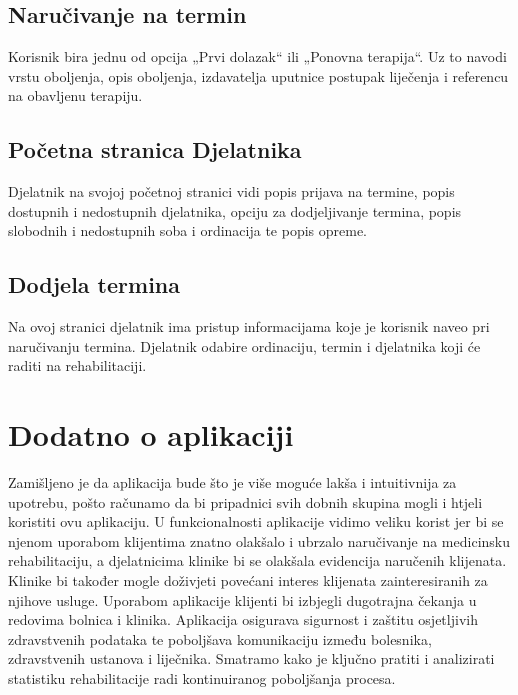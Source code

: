         \subsection{Naručivanje na termin}

        Korisnik bira jednu od opcija „Prvi dolazak“ ili „Ponovna terapija“. Uz to navodi vrstu oboljenja, opis oboljenja, izdavatelja uputnice postupak liječenja i referencu na obavljenu terapiju.

        \subsection{Početna stranica Djelatnika}

        Djelatnik na svojoj početnoj stranici vidi popis prijava na termine, popis dostupnih i nedostupnih djelatnika, opciju za dodjeljivanje termina, popis slobodnih i nedostupnih soba i ordinacija te popis opreme.

        \subsection{Dodjela termina}

        Na ovoj stranici djelatnik ima pristup informacijama koje je korisnik naveo pri naručivanju termina. Djelatnik odabire ordinaciju, termin i djelatnika koji će raditi na rehabilitaciji.

        \section{Dodatno o aplikaciji}

        Zamišljeno je da aplikacija bude što je više moguće lakša i intuitivnija za upotrebu, pošto računamo da bi pripadnici svih dobnih skupina mogli i htjeli koristiti ovu aplikaciju. U funkcionalnosti aplikacije vidimo veliku korist jer bi se njenom uporabom klijentima  znatno olakšalo i ubrzalo naručivanje na medicinsku rehabilitaciju, a djelatnicima klinike bi se olakšala evidencija naručenih klijenata. Klinike bi također mogle doživjeti povećani interes klijenata zainteresiranih za njihove usluge. Uporabom aplikacije klijenti bi izbjegli dugotrajna čekanja u redovima bolnica i klinika. Aplikacija osigurava sigurnost i zaštitu osjetljivih zdravstvenih podataka te poboljšava komunikaciju između bolesnika, zdravstvenih ustanova i liječnika. Smatramo kako je ključno pratiti i analizirati statistiku rehabilitacije radi kontinuiranog poboljšanja procesa.


